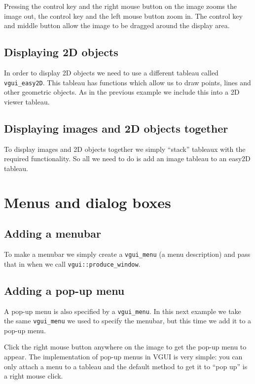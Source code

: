 \documentclass[12pt]{report}
\newcommand{\FSMinput}[1]{}
\begin{document}
Pressing the control key and the right mouse button on the image zooms the
image out, the control key and the left mouse button zoom in.  The control key 
and middle button allow the image to be dragged around the display area.
\FSMinput{display-image}

\section{Displaying 2D objects}
In order to display 2D objects we need to use a different tableau called {\tt vgui\_easy2D}.  
This tableau has functions which allow us to draw points, lines and other geometric
objects.  As in the previous example we include this into a 2D viewer tableau. 
\FSMinput{draw-line}

\section{Displaying images and 2D objects together}
To display images and 2D objects together we simply ``stack'' tableaux with the
required functionality.  So all we need to do is add an image tableau to an easy2D tableau.
\FSMinput{2d-example}

\chapter{Menus and dialog boxes}

\section{Adding a menubar}

To make a menubar we simply create a {\tt vgui\_menu} (a menu description) and pass that in when we call
{\tt vgui::produce\_window}.

\FSMinput{menubar-example}

\section{Adding a pop-up menu}

A pop-up menu is also specified by a {\tt vgui\_menu}.  In this next example we take the
same {\tt vgui\_menu} we used to specify the menubar, but this time we add it to a
pop-up menu.

\FSMinput{popup-example}

Click the right mouse button anywhere on the image to get the pop-up menu to appear. 
The implementation of pop-up menus in VGUI is very simple: you can only attach a menu 
to a tableau and the default method to get it to ``pop up'' is a right mouse click.
\end{document}
